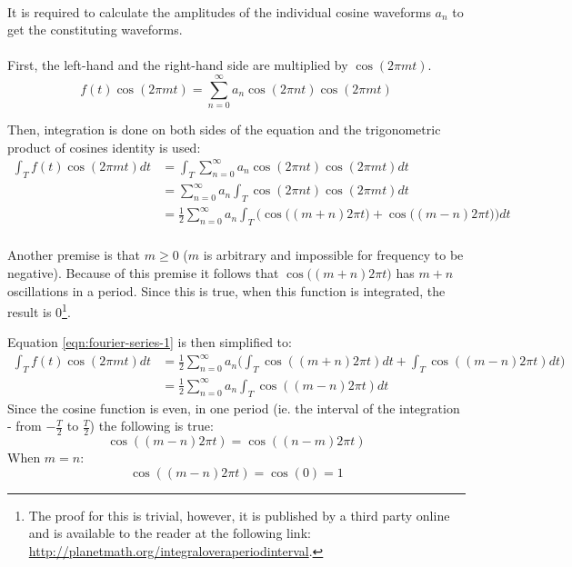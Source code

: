 \documentclass{article}
\begin{document}
\paragraph*{}
It is required to calculate the amplitudes of the individual cosine waveforms 
$a_n$ to get the constituting waveforms.

\paragraph*{}
First, the left-hand and the right-hand side are multiplied by $\cos(2 \pi m t)$.
$$f(t) \cos(2 \pi m t) = \sum^{\infty}_{n=0}a_n \cos(2 \pi n t) \cos(2 \pi m t)$$

Then, integration is done on both sides of the equation and the trigonometric 
product of cosines identity is used:
\begin{equation}
	\begin{aligned}
		\int_{T} f(t) \cos(2 \pi m t) dt &= 
		\int_{T} \sum^{\infty}_{n=0} a_n \cos(2 \pi n t) \cos(2 \pi m t) dt \\
		&= \sum^{\infty}_{n=0} a_n \int_{T} \cos(2 \pi n t) \cos(2 \pi m t) dt \\
		&= \frac{1}{2} \sum^{\infty}_{n=0} a_n \int_{T} \Big(\cos \big( (m + n) 2 \pi t \big) + \cos \big( (m - n) 2 \pi t \big) \Big) dt \\
	\end{aligned}
	\label{eqn:fourier-series-1}
\end{equation}

Another premise is that $m \geq 0$ ($m$ is arbitrary and impossible for
frequency to be negative). Because of this premise it follows that $\cos \big(
(m + n) 2 \pi t \big)$ has $m + n$ oscillations in a period. Since this is true,
when this function is integrated, the result is $0$\footnote{The proof for this
is trivial, however, it is published by a third party online and is available to
the reader at the following link:
\url{http://planetmath.org/integraloveraperiodinterval}.}.

Equation \ref{eqn:fourier-series-1} is then simplified to:
\begin{equation}
	\begin{aligned}
		\int_{T} f(t) \cos(2 \pi m t) dt &=
		\frac{1}{2} \sum^{\infty}_{n=0} a_n \bigg(\int_{T} \cos( (m + n) 2 \pi t) dt + 
		\int_{T} \cos( (m - n) 2 \pi t) dt \bigg) \\
		&= \frac{1}{2} \sum^{\infty}_{n=0} a_n \int_{T} \cos( (m - n) 2 \pi t) dt
	\end{aligned}
	\label{eqn:fourier-series-2}
\end{equation}
Since the cosine function is even, in one period (ie. the interval of the
integration - from $-\frac{T}{2}$ to $\frac{T}{2}$) the following is true:
$$\cos( (m - n) 2 \pi t) = \cos( (n - m) 2 \pi t)$$
When $m = n$:
$$\cos( (m - n) 2 \pi t) = \cos(0) = 1$$
\end{document}
